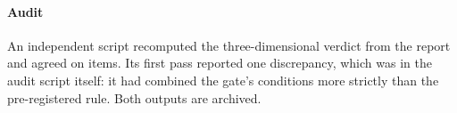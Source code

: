 \paragraph{Audit}
An independent script recomputed the three-dimensional verdict from the report and agreed
on \numAuditItems{} items. Its first pass reported one discrepancy, which was in the audit
script itself: it had combined the gate's conditions more strictly than the pre-registered
rule. Both outputs are archived.

